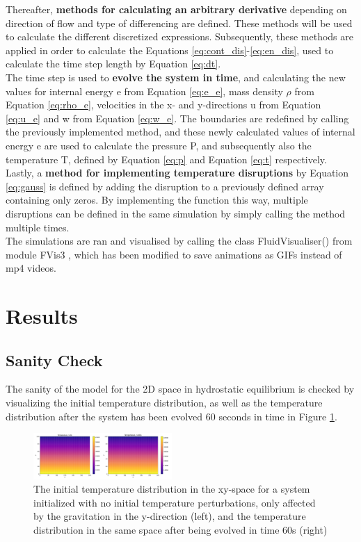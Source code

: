 \documentclass[10pt, nofootinbib, twocolumn]{revtex4-1}
\begin{document}
Thereafter, \textbf{methods for calculating an arbitrary derivative} depending on direction of flow and type of differencing are defined. These methods will be used to calculate the different discretized expressions. Subsequently, these methods are applied in order to calculate the Equations \eqref{eq:cont_dis}-\eqref{eq:en_dis}, used to calculate the time step length by Equation \eqref{eq:dt}. \\

The time step is used to \textbf{evolve the system in time}, and calculating the new values for internal energy e from Equation \eqref{eq:e_e}, mass density $\rho$ from Equation \eqref{eq:rho_e}, velocities in the x- and y-directions u from Equation \eqref{eq:u_e} and w from Equation \eqref{eq:w_e}. The boundaries are redefined by calling the previously implemented method, and these newly calculated values of internal energy e are used to calculate the pressure P, and subsequently also the temperature T, defined by Equation \eqref{eq:p} and Equation \eqref{eq:t} respectively. \\ 

Lastly, a \textbf{method for implementing temperature disruptions} by Equation \eqref{eq:gauss} is defined by adding the disruption to a previously defined array containing only zeros. By implementing the function this way, multiple disruptions can be defined in the same simulation by simply calling the method multiple times. \\ 

The simulations are ran and visualised by calling the class FluidVisualiser() from module FVis3 \cite{fvis}, which has been modified to save animations as GIFs instead of mp4 videos. 
\newpage
\section{Results}\label{sec:results}
\subsection{Sanity Check}
The sanity of the model for the 2D space in hydrostatic equilibrium is checked by visualizing the initial temperature distribution, as well as the temperature distribution after the system has been evolved 60 seconds in time in Figure \ref{fig:sanity}.
\begin{figure}[H]
    \centering
    \includegraphics[width = 0.47\textwidth]{figures/sanity_check.pdf} 
    \caption{The initial temperature distribution in the xy-space for a system initialized with no initial temperature perturbations, only affected by the gravitation in the y-direction (left), and the temperature distribution in the same space after being evolved in time 60s (right)}
    \label{fig:sanity}
\end{figure}
\end{document}
